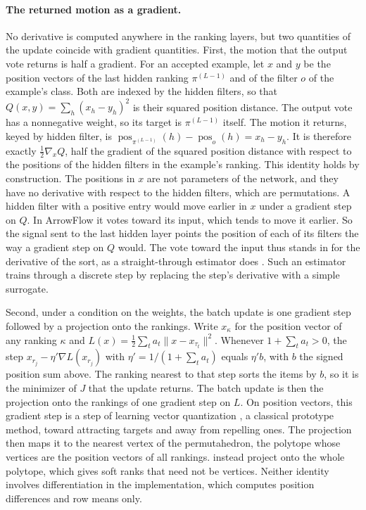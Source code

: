 \paragraph{The returned motion as a gradient.} No derivative is computed anywhere in the ranking layers, but two quantities of the update coincide with gradient quantities. First, the motion that the output vote returns is half a gradient. For an accepted example, let $x$ and $y$ be the position vectors of the last hidden ranking $\pi^{(L-1)}$ and of the filter $o$ of the example's class. Both are indexed by the hidden filters, so that $Q(x,y)=\sum_h(x_h-y_h)^2$ is their squared position distance. The output vote has a nonnegative weight, so its target is $\pi^{(L-1)}$ itself. The motion it returns, keyed by hidden filter, is $\operatorname{pos}_{\pi^{(L-1)}}(h)-\operatorname{pos}_{o}(h)=x_h-y_h$. It is therefore exactly $\tfrac12\nabla_xQ$, half the gradient of the squared position distance with respect to the positions of the hidden filters in the example's ranking. This identity holds by construction. The positions in $x$ are not parameters of the network, and they have no derivative with respect to the hidden filters, which are permutations. A hidden filter with a positive entry would move earlier in $x$ under a gradient step on $Q$. In ArrowFlow it votes toward its input, which tends to move it earlier. So the signal sent to the last hidden layer points the position of each of its filters the way a gradient step on $Q$ would. The vote toward the input thus stands in for the derivative of the sort, as a straight-through estimator does \citep{bengio2013estimating}. Such an estimator trains through a discrete step by replacing the step's derivative with a simple surrogate.

Second, under a condition on the weights, the batch update is one gradient step followed by a projection onto the rankings. Write $x_\kappa$ for the position vector of any ranking $\kappa$ and $L(x)=\tfrac12\sum_ta_t\|x-x_{\tau_t}\|^2$. Whenever $1+\sum_ta_t>0$, the step $x_{r_j}-\eta'\nabla L(x_{r_j})$ with $\eta'=1/(1+\sum_ta_t)$ equals $\eta'b$, with $b$ the signed position sum above. The ranking nearest to that step sorts the items by $b$, so it is the minimizer of $J$ that the update returns. The batch update is then the projection onto the rankings of one gradient step on $L$. On position vectors, this gradient step is a step of learning vector quantization \citep{kohonen1990self}, a classical prototype method, toward attracting targets and away from repelling ones. The projection then maps it to the nearest vertex of the permutahedron, the polytope whose vertices are the position vectors of all rankings. \citet{blondel2020fast} instead project onto the whole polytope, which gives soft ranks that need not be vertices. Neither identity involves differentiation in the implementation, which computes position differences and row means only.

